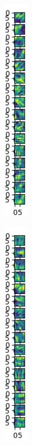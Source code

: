 \documentclass[12pt]{article}
\begin{document}
\begin{figure}[h]
{\begin{subfigure}{1.3cm}
						\captionsetup{justification=centering,margin=0.4cm}
					\end{subfigure}	
				\begin{subfigure}{1.3cm}
					\centering
					\includegraphics[width=1.3cm]{../Images/Feature_Maps_Cropped/image_6.png}
					\captionsetup{justification=centering,margin=1cm}
				\end{subfigure}
				\begin{subfigure}{1.3cm}
					\centering
					\includegraphics[width=1.3cm]{../Images/Feature_Maps_Cropped/image_7.png}

\end{subfigure}}
\end{figure}
\end{document}
